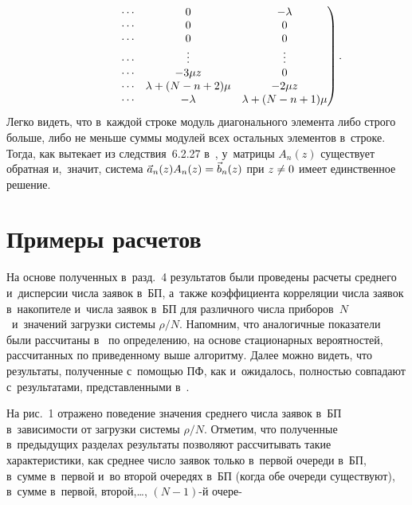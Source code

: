 \begin{multicols}{2}
\noindent
\begin{equation*}
\hspace*{15mm}\left.\begin{matrix}
\cdots  & 0  & - \lambda\\
\cdots        & 0    & 0       \\
\cdots    & 0    & 0      \\
\cdots   & \vdots     & \vdots       \\
\cdots  & - 3 \mu z     & 0       \\
\cdots   & \lambda +(N-n+2) \mu & - 2 \mu z       \\
\cdots      & - \lambda  & \lambda +(N-n+1)\mu
\end{matrix}\right).
\end{equation*}
Легко видеть, что в~каждой строке модуль диагонального
элемента либо строго больше, либо не меньше суммы
модулей всех остальных элементов в~строке.
Тогда, как вытекает из следствия~6.2.27 в~\cite{horn},
у~матрицы $A_n(z)$ существует обратная
и,~значит, система $\vec{a}_n(z) A_n(z) \hm= \vec{b}_n(z)$
при $z\hm\neq 0$ имеет единственное решение.

\vspace*{-4pt}

\section{Примеры расчетов}

На основе полученных в~разд.~4 результатов {были} проведены расчеты
среднего и~дисперсии чис\-ла заявок в~БП,
а~также коэффициента корреляции числа заявок в~накопителе и~числа
заявок в~БП для различного чис\-ла
приборов~$N$~и~значений загрузки системы $\rho/N$. \mbox{Напомним}, что аналогичные
показатели были рассчитаны в~\cite{a8} по определению, на основе
стационарных вероятностей, рассчитанных по приведенному выше
алгоритму. Далее можно видеть, что результаты, полученные с~по\-мощью
ПФ, как и~ожидалось, полностью совпадают с~результатами,
представленными в~\cite{a8}.

На рис.~1 отражено поведение значения среднего числа заявок
в~БП в~зависимости от загрузки системы $\rho/N$.
Отметим, что полученные в~предыдущих  разделах результаты позволяют
рассчитывать такие
 характеристики, как среднее число заявок только
в~первой очереди в~БП, в~сумме в~первой и~во второй очередях в~БП
(когда обе очереди существуют), в~сумме в~первой, второй,\ldots ,
$(N-1)$-й очере-\linebreak\vspace*{-12pt}


\end{multicols}
